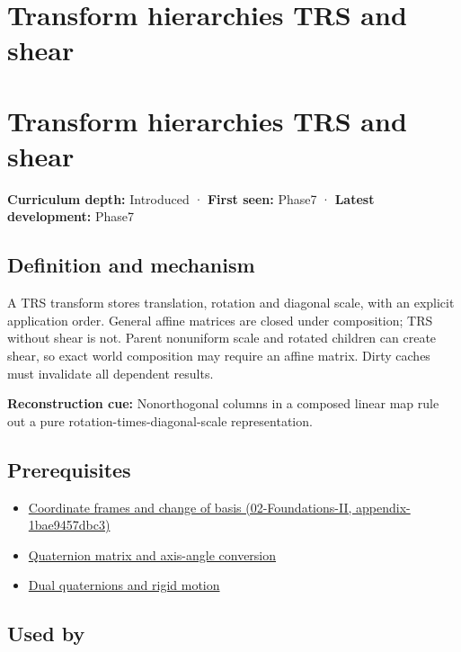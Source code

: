 \hypertarget{appendix-292c061cd47c}{}
\section*{Transform hierarchies TRS and shear}
\section{Transform hierarchies TRS and shear}\label{appendix-292c061cd47c-transform-hierarchies-trs-and-shear}

\textbf{Curriculum depth:} Introduced · \textbf{First seen:} Phase7 · \textbf{Latest development:} Phase7

\subsection{Definition and mechanism}\label{appendix-292c061cd47c-definition-and-mechanism}

A TRS transform stores translation, rotation and diagonal scale, with an explicit application order. General affine matrices are closed under composition; TRS without shear is not. Parent nonuniform scale and rotated children can create shear, so exact world composition may require an affine matrix. Dirty caches must invalidate all dependent results.

\textbf{Reconstruction cue:} Nonorthogonal columns in a composed linear map rule out a pure rotation-times-diagonal-scale representation.

\subsection{Prerequisites}\label{appendix-292c061cd47c-prerequisites}

\begin{itemize}
\tightlist
\item
  \href{../02-Foundations-II/main.pdf\#nameddest=appendix-1bae9457dbc3}{Coordinate frames and change of basis (02-Foundations-II, appendix-1bae9457dbc3)}
\item
  \hyperref[appendix-26d8da71f6c4]{Quaternion matrix and axis-angle conversion}
\item
  \hyperref[appendix-d1ea57347893]{Dual quaternions and rigid motion}
\end{itemize}

\subsection{Used by}\label{appendix-292c061cd47c-used-by}

